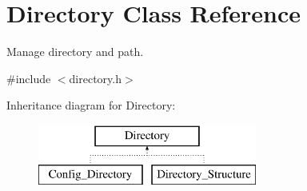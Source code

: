 \hypertarget{class_directory}{}\section{Directory Class Reference}
\label{class_directory}


Manage directory and path.  




{\ttfamily \#include $<$directory.\+h$>$}

Inheritance diagram for Directory\+:\begin{figure}[H]
\begin{center}
\leavevmode
\includegraphics[height=2.000000cm]{class_directory}
\end{center}
\end{figure}
